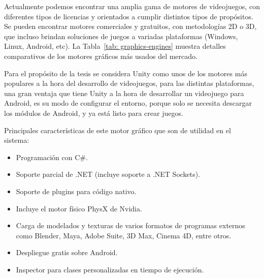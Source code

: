 Actualmente podemos encontrar una amplia gama de motores de videojuegos, con diferentes tipos de licencias y orientados a cumplir distintos tipos de propósitos. Se pueden encontrar motores comerciales y gratuitos, con metodologías 2D o 3D, que incluso brindan soluciones de juegos a variadas plataformas (Windows, Linux, Android, etc). La Tabla~\ref{tab: graphics-engines} muestra detalles comparativos de los motores gráficos más usados del mercado.

Para el propósito de la tesis se considera Unity como unos de los motores más populares a la hora del desarrollo de videojuegos, para las distintas plataformas, una gran ventaja que tiene Unity a la hora de desarrollar un videojuego para Android, es su modo de configurar el entorno, porque solo se necesita descargar los módulos de Android, y ya está listo para crear juegos.

Principales características de este motor gráfico que son de utilidad en el sistema:~\cite{unity3d}
\begin{itemize}
    \item Programación con C\#.
    \item Soporte parcial de .NET (incluye soporte a .NET Sockets).
    \item Soporte de plugins para código nativo.
    \item Incluye el motor físico PhysX de Nvidia.
    \item Carga de modelados y texturas de varios formatos de programas externos como Blender, Maya, Adobe Suite, 3D Max, Cinema 4D, entre otros.
    \item Despliegue gratis sobre Android.
    \item Inspector para clases personalizadas en tiempo de ejecución.
\end{itemize}

